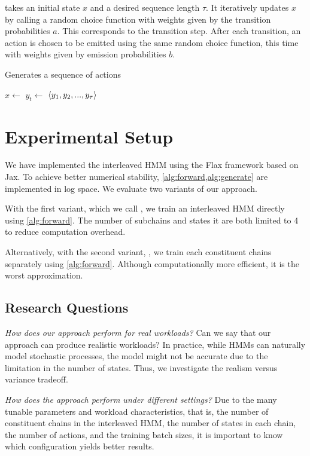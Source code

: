  takes an initial state \(x\) and a desired sequence length \(\tau\). It iteratively updates \(x\) by calling a random choice function with weights given by the transition probabilities \(a\). This corresponds to the transition step. After each transition, an action is chosen to be emitted using the same random choice function, this time with weights given by emission probabilities \(b\).

\begin{algorithm}
    \caption{Generates a sequence of actions}\label{alg:generate}
    \begin{algorithmic}[1]
                \State $x \gets$ 
                \State $y_t \gets$ 
            \EndFor
            \State \Return $\langle y_1, y_2, ..., y_\tau\rangle$
        \EndProcedure
    \end{algorithmic}
\end{algorithm}

\section{Experimental Setup}\label{sec:experimental_setup}

We have implemented the interleaved HMM using the Flax\cite{Heek2023-nl} framework based on Jax\cite{Bradbury2018-jz}. To achieve better numerical stability, \cref{alg:forward,alg:generate} are implemented in log space.
We evaluate two variants of our approach.

With the first variant, which we call \worklogalpha{}, we train an interleaved HMM directly using \cref{alg:forward}. The number of subchains and states it are both limited to 4 to reduce computation overhead.

Alternatively, with the second variant, \worklogbeta{}, we train each constituent chains separately using \cref{alg:forward}. Although computationally more efficient, it is the worst approximation.

\subsection{Research Questions}

\begin{researchquestions}
    \item\label{rq:performance} \emph{How does our approach perform for real workloads?} Can we say that our approach can produce realistic workloads? In practice, while HMMs can naturally model stochastic processes, the model might not be accurate due to the limitation in the number of states. Thus, we investigate the realism versus variance tradeoff.
    \item\label{rq:ablation} \emph{How does the approach perform under different settings?} Due to the many tunable parameters and workload characteristics, that is, the number of constituent chains in the interleaved HMM, the number of states in each chain, the number of actions, and the training batch sizes, it is important to know which configuration yields better results.
\end{researchquestions}

